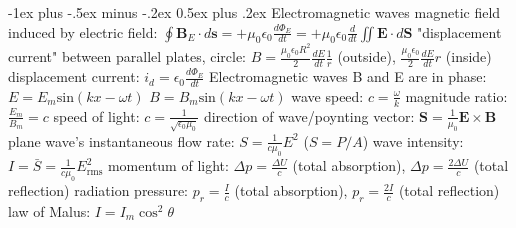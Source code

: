 \documentclass[10pt,landscape]{article}
\makeatletter
\renewcommand{\subsection}{\@startsection{subsection}{2}{0mm}%
                                {-1ex plus -.5ex minus -.2ex}%
                                {0.5ex plus .2ex}%
                                {\normalfont\normalsize\bfseries}}
\newcommand{\spc}{\hspace*{1em}}
\makeatother
\begin{document}
\begin{multicols}{3}
\subsection{Electromagnetic waves}
magnetic field induced by electric field: $\oint \mathbf{B}_E\cdot d\mathbf{s}=+\mu _0\epsilon _0\frac{d\Phi _E}{dt}=+\mu _0\epsilon _0\frac{d}{dt}\iint\mathbf{E}\cdot d\mathbf{S}$
\newline
"displacement current" between parallel plates, circle: 
\newline
\spc $B=\frac{\mu _0\epsilon _0R^2}{2}\frac{dE}{dt}\frac{1}{r}$ (outside), $\frac{\mu _0\epsilon _0}{2}\frac{dE}{dt}r$ (inside)
\newline
displacement current: $i_d=\epsilon _0\frac{d\Phi _E}{dt}$
\newline \newline
Electromagnetic waves
\newline
\spc B and E are in phase:
\newline
\spc\spc $E=E_m\mathrm{sin}(kx-\omega t)$
\newline
\spc\spc $B=B_m\mathrm{sin}(kx-\omega t)$
\newline
\spc wave speed: $c=\frac{\omega }{k}$
\newline
\spc magnitude ratio: $\frac{E_m}{B_m}=c$
\newline
\spc speed of light: $c=\frac{1}{\sqrt{\epsilon _0\mu _0}}$
\newline
\spc direction of wave/poynting vector: $\mathbf{S}=\frac{1}{\mu _0}\mathbf{E}\times \mathbf{B}$
\newline \newline
plane wave's instantaneous flow rate: $S=\frac{1}{c\mu _0}E^2$ ($S=P/A$)
\newline
wave intensity: $I=\bar{S}=\frac{1}{c\mu _0}E_{\textrm{rms}}^2$
\newline
momentum of light: 
\newline
\spc $\Delta p=\frac{\Delta U}{c}$ (total absorption), $\Delta p=\frac{2\Delta U}{c}$ (total reflection)
\newline
radiation pressure:
\newline
\spc $p_r=\frac{I}{c}$ (total absorption), $p_r=\frac{2I}{c}$ (total reflection)
\newline
law of Malus: $I=I_m \cos ^2\theta $


\end{multicols}
\end{document}
